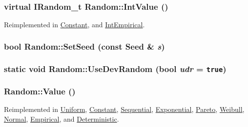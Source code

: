 \hypertarget{classRandom_9ac522e9fe39aefd2cddd88554184b1a}{
\subsubsection[{IntValue}]{\setlength{\rightskip}{0pt plus 5cm}virtual {\bf IRandom\_\-t} Random::IntValue ()}}
\label{classRandom_9ac522e9fe39aefd2cddd88554184b1a}




Reimplemented in \hyperlink{classConstant_e7b431ef8fb785186bb846d23b5ccb95}{Constant}, and \hyperlink{classIntEmpirical_71e5695d2c4b6b6a853cbb2992f81d48}{IntEmpirical}.\hypertarget{classRandom_afb76e3ca095211f6b527848d46ef24d}{
\subsubsection[{SetSeed}]{\setlength{\rightskip}{0pt plus 5cm}bool Random::SetSeed (const {\bf Seed} \& {\em s})}}
\label{classRandom_afb76e3ca095211f6b527848d46ef24d}


\hypertarget{classRandom_3634f94bc30d04479d5fc7aeaadb00d8}{
\subsubsection[{UseDevRandom}]{\setlength{\rightskip}{0pt plus 5cm}static void Random::UseDevRandom (bool {\em udr} = {\tt true})}}
\label{classRandom_3634f94bc30d04479d5fc7aeaadb00d8}


\hypertarget{classRandom_4d1c2876c5c78104186e241209d0e11e}{
\subsubsection[{Value}]{ Random::Value ()}}
\label{classRandom_4d1c2876c5c78104186e241209d0e11e}




Reimplemented in \hyperlink{classUniform_0e0f9905cd20d6e6560d168ac75bbce2}{Uniform}, \hyperlink{classConstant_8c4e39053835302870f15f5bbf0dc29e}{Constant}, \hyperlink{classSequential_d3a1aca0362e90ff3e8f8fc9c96152d8}{Sequential}, \hyperlink{classExponential_c2ad56e3dc3e65673cb54cab95d34a53}{Exponential}, \hyperlink{classPareto_c92998c5176de1ee80e64302ce2eec73}{Pareto}, \hyperlink{classWeibull_1c4aeb6b0efae805a5ae36b072a8f4c6}{Weibull}, \hyperlink{classNormal_f9f5b8c8ba6dff8beb660a70935dd99e}{Normal}, \hyperlink{classEmpirical_76b4c62b6fdcfbe2dbaff2462e4153ad}{Empirical}, and \hyperlink{classDeterministic_5bca3d51cb08d3ec23579e09ce8e713f}{Deterministic}.

